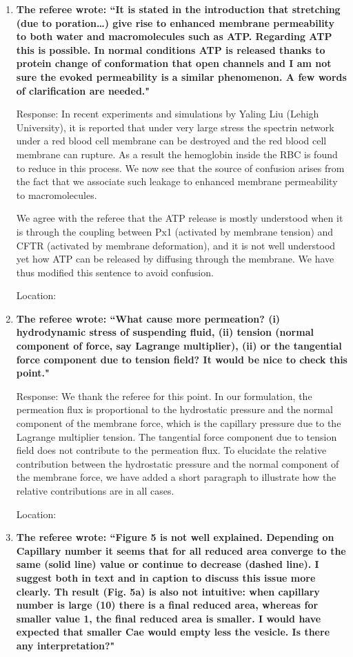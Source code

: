 \documentclass[12pt]{article}
\begin{document}
\begin{enumerate}
\item {\bf 
The referee wrote:
``It is stated in the introduction that stretching (due to poration…)
give rise to enhanced membrane permeability to both water and
macromolecules such as ATP. Regarding ATP this is possible. In normal
conditions ATP is released thanks to protein change of conformation
that open channels and I am not sure the evoked permeability is a
similar phenomenon. A few words of clarification are needed."}

\noindent
Response: In recent experiments and simulations by Yaling Liu (Lehigh University), it is reported that under very large stress the spectrin network under a red blood cell membrane can be destroyed and the red blood cell membrane can rupture. As a result the hemoglobin inside the RBC is found to reduce in this process. We now see that the source of confusion arises from the fact that we associate such leakage to enhanced membrane permeability to macromolecules. 

We agree with the referee that the ATP release is mostly understood when it is through the coupling between Px1 (activated by membrane tension) and CFTR (activated by membrane deformation), and it is not well understood yet how ATP can be released by diffusing through the membrane. We have thus modified this sentence to avoid confusion.

\noindent
Location: 

\item {\bf
The referee wrote:
``What cause more permeation? (i) hydrodynamic stress of suspending
fluid, (ii) tension (normal component of force, say Lagrange
multiplier), (ii) or the tangential force component due to tension
field? It would be nice to check this point."}

\noindent
Response: We thank the referee for this point. In our formulation, the permeation flux is proportional to the hydrostatic pressure and the normal component of the membrane force, which is the capillary pressure due to the Lagrange multiplier tension. The tangential force component due to tension field does not contribute to the permeation flux. To elucidate the relative contribution between the hydrostatic pressure and the normal component of the membrane force, we have added a short paragraph to illustrate how the relative contributions are in all cases.

\noindent
Location:


\item {\bf 
The referee wrote:
``Figure 5 is not well explained. Depending on Capillary number it
seems that for all reduced area converge to the same (solid line)
value or continue to decrease (dashed line). I suggest both in text
and in caption to discuss this issue more clearly. Th result (Fig. 5a)
is also not intuitive: when capillary number is large (10) there is a
final reduced area, whereas for smaller value 1, the final reduced
area is smaller. I would have expected that smaller Cae would empty
less the vesicle. Is there any interpretation?"}


\end{enumerate}
\end{document}

